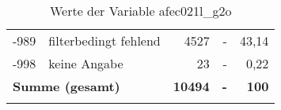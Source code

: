 \begin{longtable}{Xlrrr}
       -989 & filterbedingt fehlend & 4527 & - & 43,14 \\

       -998 & keine Angabe & 23 & - & 0,22 \\

     \midrule
     \multicolumn{2}{l}{\textbf{Summe (gesamt)}} & \textbf{10494} & \textbf{-} & \textbf{100} \\
     \bottomrule
     \caption{Werte der Variable afec021l\_g2o}
     \end{longtable}
     

